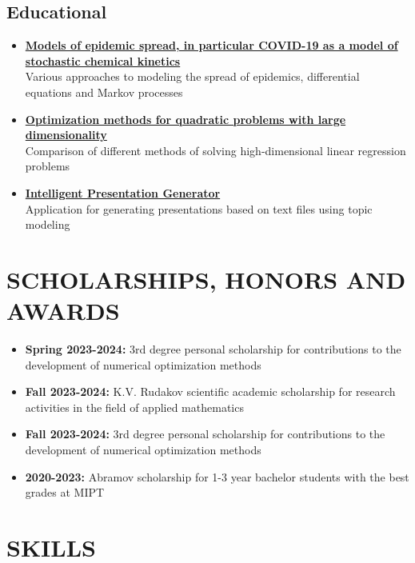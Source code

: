 \documentclass[12pt]{moderncv}
\begin{document}
        \subsection{Educational}

        \begin{itemize}
            \item \href{https://github.com/kisnikser/Epidemic-Spread-Models}{\textbf{Models of epidemic spread, in particular COVID-19 as a model of stochastic chemical kinetics}}\\
            Various approaches to modeling the spread of epidemics, differential equations and Markov processes
            \item \href{https://github.com/kisnikser/Optimization-Methods}{\textbf{Optimization methods for quadratic problems with large dimensionality}}\\
            Comparison of different methods of solving high-dimensional linear regression problems
            \item \href{https://github.com/kisnikser/Intelligent-Presentation-Generator}{\textbf{Intelligent Presentation Generator}}\\
            Application for generating presentations based on text files using topic modeling
        \end{itemize}

    \section{SCHOLARSHIPS, HONORS AND AWARDS}

        \begin{itemize}
            \item \textbf{Spring 2023-2024:} 3rd degree personal scholarship for contributions to the development of numerical optimization methods
            \item \textbf{Fall 2023-2024:} K.V. Rudakov scientific academic scholarship for research activities in the field of applied mathematics
            \item \textbf{Fall 2023-2024:} 3rd degree personal scholarship for contributions to the development of numerical optimization methods
            \item \textbf{2020-2023:} Abramov scholarship for 1-3 year bachelor students with the best grades at MIPT
        \end{itemize}

    \section{SKILLS}
    
\end{document}

